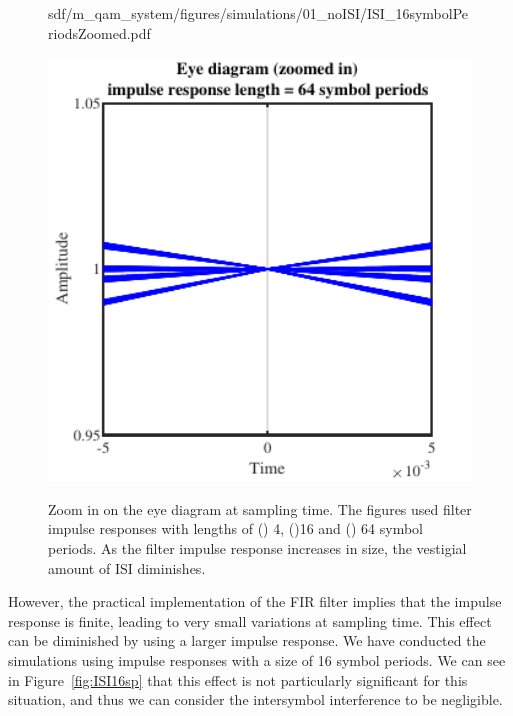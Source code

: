 \begin{figure}[H]
\begin{minipage}{0.3\textwidth}
		{sdf/m_qam_system/figures/simulations/01_noISI/ISI_16symbolPeriodsZoomed.pdf}
		\subcaption{}\label{fig:ISI16sp}
	\end{minipage}
	\begin{minipage}{0.3\textwidth}
		\centering
		\includegraphics[width=1\textwidth]
		{sdf/m_qam_system/figures/simulations/01_noISI/ISI_64symbolPeriodsZoomed.pdf}
		\subcaption{}\label{fig:ISI64sp}
	\end{minipage}
	\caption{Zoom in on the eye diagram at sampling time. The figures used 
	filter impulse responses with lengths of () 4, 
	()16 and 
	() 64 symbol periods. As the filter impulse 
	response increases in size, the vestigial amount of ISI 
	diminishes.}\label{fig:ISIdemo}
\end{figure}

However, the practical implementation of the FIR filter implies that 
the impulse response is finite, leading to very small variations at sampling 
time. This effect can be diminished by using a larger impulse response. We have 
conducted the simulations using impulse responses with a size of 16 symbol 
periods. We can see in Figure~\ref{fig:ISI16sp} that this effect is not 
particularly significant for this situation, and thus we can consider the 
intersymbol interference to be negligible.

